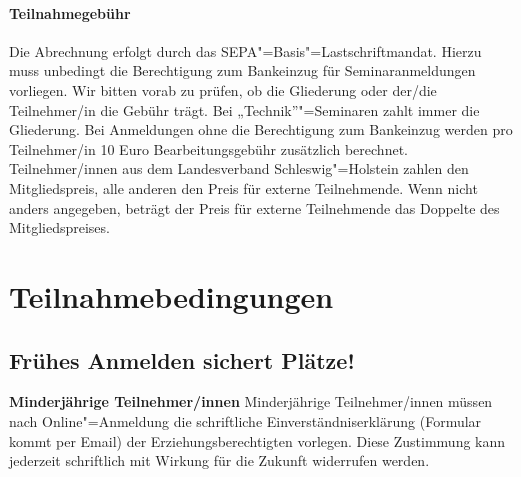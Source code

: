 \paragraph{Teilnahmegebühr}
Die Abrechnung erfolgt durch das SEPA"=Basis"=Lastschriftmandat.
Hierzu muss unbedingt die Berechtigung zum Bankeinzug für Seminaranmeldungen vorliegen. Wir bitten vorab zu prüfen, ob die
Gliederung oder der/die Teilnehmer/in die Gebühr trägt. Bei „Technik”"=Seminaren zahlt immer die Gliederung. Bei Anmeldungen
ohne die Berechtigung zum Bankeinzug werden pro Teilnehmer/in
10 Euro Bearbeitungsgebühr zusätzlich berechnet.
Teilnehmer/innen aus dem Landesverband Schleswig"=Holstein zahlen den Mitgliedspreis, 
alle anderen den Preis für externe Teilnehmende. Wenn nicht anders angegeben, beträgt der Preis für externe
Teilnehmende das Doppelte des Mitgliedspreises.

\newpage
\section*{Teilnahmebedingungen}
\subsection*{Frühes Anmelden sichert Plätze!}


\textbf{Minderjährige Teilnehmer/innen}\newline
Minderjährige Teilnehmer/innen müssen nach Online"=Anmeldung
die schriftliche Einverständniserklärung (Formular kommt per Email)
der Erziehungsberechtigten vorlegen.
Diese Zustimmung kann jederzeit schriftlich mit Wirkung für die Zukunft widerrufen werden.\newline

